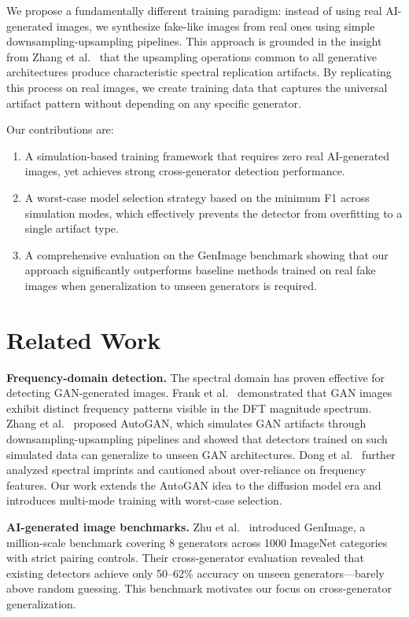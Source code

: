 \documentclass[11pt,a4paper]{article}
\begin{document}
We propose a fundamentally different training paradigm: instead of using real AI-generated images, we synthesize fake-like images from real ones using simple downsampling-upsampling pipelines. This approach is grounded in the insight from Zhang et al.~\cite{zhang2020detecting} that the upsampling operations common to all generative architectures produce characteristic spectral replication artifacts. By replicating this process on real images, we create training data that captures the universal artifact pattern without depending on any specific generator.

Our contributions are:
\begin{enumerate}[nosep]
    \item A simulation-based training framework that requires zero real AI-generated images, yet achieves strong cross-generator detection performance.
    \item A worst-case model selection strategy based on the minimum F1 across simulation modes, which effectively prevents the detector from overfitting to a single artifact type.
    \item A comprehensive evaluation on the GenImage benchmark showing that our approach significantly outperforms baseline methods trained on real fake images when generalization to unseen generators is required.
\end{enumerate}

\section{Related Work}

\textbf{Frequency-domain detection.}
The spectral domain has proven effective for detecting GAN-generated images. Frank et al.~\cite{frank2020leveraging} demonstrated that GAN images exhibit distinct frequency patterns visible in the DFT magnitude spectrum. Zhang et al.~\cite{zhang2020detecting} proposed AutoGAN, which simulates GAN artifacts through downsampling-upsampling pipelines and showed that detectors trained on such simulated data can generalize to unseen GAN architectures. Dong et al.~\cite{dong2022think} further analyzed spectral imprints and cautioned about over-reliance on frequency features. Our work extends the AutoGAN idea to the diffusion model era and introduces multi-mode training with worst-case selection.

\textbf{AI-generated image benchmarks.}
Zhu et al.~\cite{zhu2023genimage} introduced GenImage, a million-scale benchmark covering 8 generators across 1000 ImageNet categories with strict pairing controls. Their cross-generator evaluation revealed that existing detectors achieve only 50--62\% accuracy on unseen generators---barely above random guessing. This benchmark motivates our focus on cross-generator generalization.
\end{document}
